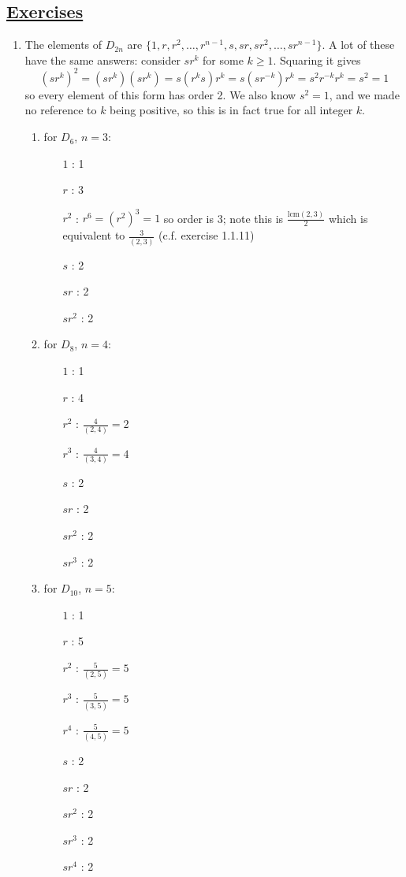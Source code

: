 \documentclass[]{article}
\begin{document}
\subsection*{\underline{Exercises}}
\begin{enumerate}

\item The elements of $D_{2n}$ are $\{1, r, r^2, \ldots, r^{n-1}, s, sr, sr^2, \ldots, sr^{n-1}\}$. A lot of these have the same answers: consider $sr^k$ for some $k\geq 1$. Squaring it gives
\begin{equation}
(sr^k)^2 = (sr^k)(sr^k) = s(r^ks)r^k = s(sr^{-k})r^k = s^2r^{-k}r^k = s^2 = 1 \label{eq:2.1}
\end{equation}
so every element of this form has order 2. We also know $s^2 = 1$, and we made no reference to $k$ being positive, so this is in fact true for all integer $k$. 
\begin{enumerate}
\item for $D_6$, $n=3$:
\begin{enumerate}
\item[$1$]: 1
\item[$r$]: 3 
\item[$r^2$]: $r^6 = (r^2)^3 = 1$ so order is 3; note this is $\frac{\text{lcm}(2,3)}{2}$ which is equivalent to $\frac{3}{(2,3)}$ (c.f. exercise 1.1.11)
\item[$s$]: 2
\item[$sr$]: 2
\item[$sr^2$]: 2
\end{enumerate}

\item for $D_8$, $n=4$:
\begin{enumerate}
\item[$1$]: 1
\item[$r$]: 4
\item[$r^2$]: $\frac{4}{(2,4)} = 2$
\item[$r^3$]: $\frac{4}{(3,4)} = 4$
\item[$s$]: 2
\item[$sr$]: 2
\item[$sr^2$]: 2
\item[$sr^3$]: 2
\end{enumerate}

\item for $D_{10}$, $n=5$:
\begin{enumerate}
\item[$1$]: 1
\item[$r$]: 5
\item[$r^2$]: $\frac{5}{(2,5)} = 5$
\item[$r^3$]: $\frac{5}{(3,5)} = 5$
\item[$r^4$]: $\frac{5}{(4,5)} = 5$
\item[$s$]: 2
\item[$sr$]: 2
\item[$sr^2$]: 2
\item[$sr^3$]: 2
\item[$sr^4$]: 2
\end{enumerate}


\end{enumerate}
\end{enumerate}
\end{document}
